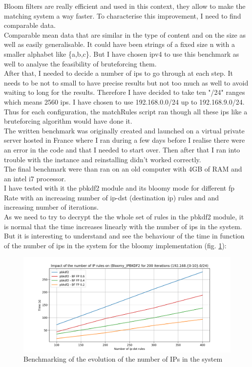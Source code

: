 \documentclass{eplmastersthesis}
\begin{document}
Bloom filters are really efficient and used in this context, they allow to make the matching system a way faster. To characterise this improvement, I need to find comparable data.\\
Comparable mean data that are similar in the type of content and on the size as well as easily generalisable. It could have been strings of a fixed size n with a smaller alphabet like \{a,b,c\}. But I have chosen \gls{ipv4} to use this benchmark as well to analyse the feasibility of  bruteforcing them.\\
After that, I needed to decide a number of \gls{ip}s to go through at each step. It needs to be not to small to have precise results but not too much as well to avoid waiting to long for the results. Therefore I have decided to take ten "/24" ranges which means 2560 \gls{ip}s. I have chosen to use 192.168.0.0/24 up to 192.168.9.0/24.\\
Thus for each configuration, the matchRules script ran though all these \gls{ip}s like a bruteforcing algorithm would have done it.\\

The written benchmark was originally created and launched on a virtual private server hosted in France where I ran during a few days before I realise there were an error in the code and that I needed to start over. Then after that I ran into trouble with the instance and reinstalling didn't worked correctly.\\
The final benchmark were than ran on an old computer with 4GB of RAM and an intel i7 processor.\\
I have tested with it the \gls{pbkdf2} module and its bloomy mode for different \gls{fp} Rate with an increasing number of ip-dst (destination \gls{ip}) rules and and increasing number of iterations.\\

As we need to try to decrypt the the whole set of rules in the \gls{pbkdf2} module, it is normal that the time increases linearly with the number of \gls{ip}s in the system. But it is interesting to understand and see the behaviour of the time in function of the number of \gls{ip}s in the system for the bloomy implementation (fig. \ref{benchmarking:timeips}):

\begin{figure}[h!]
\begin{center}
	\includegraphics[scale=0.6]{res/TimeIPs}
	\caption{Benchmarking of the evolution of the number of IPs in the system}
	\label{benchmarking:timeips}
\end{center}
\end{figure}
\end{document}

